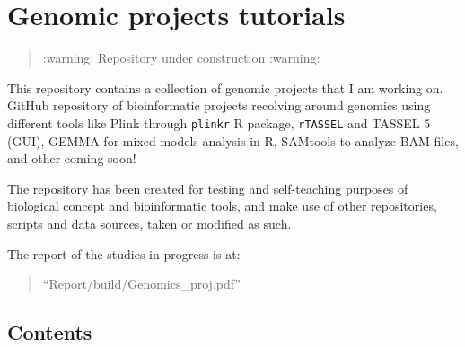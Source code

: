\hypertarget{genomic-projects-tutorials}{%
\section{Genomic projects tutorials}\label{genomic-projects-tutorials}}

\begin{quote}
:warning: Repository under construction :warning:
\end{quote}

This repository contains a collection of genomic projects that I am
working on. GitHub repository of bioinformatic projects recolving around
genomics using different tools like Plink through \texttt{plinkr} R
package, \texttt{rTASSEL} and TASSEL 5 (GUI), GEMMA for mixed models
analysis in R, SAMtools to analyze BAM files, and other coming soon!

The repository has been created for testing and self-teaching purposes
of biological concept and bioinformatic tools, and make use of other
repositories, scripts and data sources, taken or modified as such.

The report of the studies in progress is at:

\begin{quote}
``Report/build/Genomics\_proj.pdf''
\end{quote}

\hypertarget{contents}{%
\subsection{Contents}\label{contents}}

